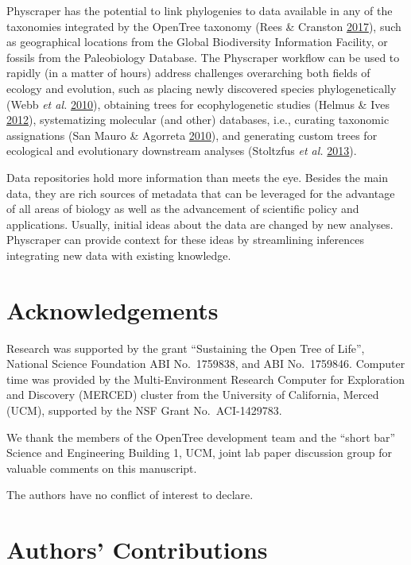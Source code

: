 \documentclass[]{article}
\begin{document}
Physcraper has the potential to link phylogenies to data available in any of the taxonomies integrated by the OpenTree taxonomy (Rees \& Cranston \protect\hyperlink{ref-rees2017automated}{2017}), such as geographical locations from the Global Biodiversity Information Facility, or fossils from the Paleobiology Database.
The Physcraper workflow can be used to rapidly (in a matter of hours)
address challenges overarching both fields of ecology and evolution, such as
placing newly discovered species phylogenetically (Webb \emph{et al.} \protect\hyperlink{ref-webb2010biodiversity}{2010}),
obtaining trees for ecophylogenetic studies (Helmus \& Ives \protect\hyperlink{ref-helmus2012phylogenetic}{2012}),
systematizing molecular (and other) databases, i.e., curating taxonomic assignations (San Mauro \& Agorreta \protect\hyperlink{ref-san2010molecular}{2010}),
and generating custom trees for ecological and evolutionary downstream analyses (Stoltzfus \emph{et al.} \protect\hyperlink{ref-stoltzfus2013phylotastic}{2013}).

Data repositories hold more information than meets the eye.
Besides the main data, they are rich sources of metadata that can be leveraged for the advantage of all areas of biology as well as the advancement of scientific policy and applications.
Usually, initial ideas about the data are changed by new analyses.
Physcraper can provide context for these ideas by streamlining inferences integrating new data with existing knowledge.

\hypertarget{acknowledgements}{%
\section{Acknowledgements}\label{acknowledgements}}

Research was supported by the grant ``Sustaining the Open Tree of Life'', National Science Foundation ABI No.~1759838, and ABI No.~1759846.
Computer time was provided by the Multi-Environment Research Computer for Exploration and Discovery (MERCED) cluster from the University of California, Merced (UCM), supported by the NSF Grant No.~ACI-1429783.

We thank the members of the OpenTree development team and the ``short bar'' Science and Engineering Building 1, UCM, joint lab paper discussion group for valuable comments on this manuscript.

The authors have no conflict of interest to declare.

\hypertarget{authors-contributions}{%
\section{Authors' Contributions}\label{authors-contributions}}
\end{document}

